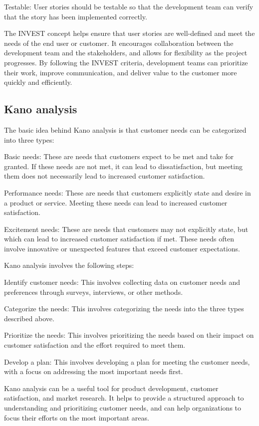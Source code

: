 \documentclass[12pt, a4paper, oneside]{article}
\begin{document}
Testable: User stories should be testable so that the development team can verify that the story has been implemented correctly.

The INVEST concept helps ensure that user stories are well-defined and meet the needs of the end user or customer. It encourages collaboration between the development team and the stakeholders, and allows for flexibility as the project progresses. By following the INVEST criteria, development teams can prioritize their work, improve communication, and deliver value to the customer more quickly and efficiently.




\subsection{ Kano analysis }
The basic idea behind Kano analysis is that customer needs can be categorized into three types:

Basic needs: These are needs that customers expect to be met and take for granted. If these needs are not met, it can lead to dissatisfaction, but meeting them does not necessarily lead to increased customer satisfaction.

Performance needs: These are needs that customers explicitly state and desire in a product or service. Meeting these needs can lead to increased customer satisfaction.

Excitement needs: These are needs that customers may not explicitly state, but which can lead to increased customer satisfaction if met. These needs often involve innovative or unexpected features that exceed customer expectations.

Kano analysis involves the following steps:

Identify customer needs: This involves collecting data on customer needs and preferences through surveys, interviews, or other methods.

Categorize the needs: This involves categorizing the needs into the three types described above.

Prioritize the needs: This involves prioritizing the needs based on their impact on customer satisfaction and the effort required to meet them.

Develop a plan: This involves developing a plan for meeting the customer needs, with a focus on addressing the most important needs first.

Kano analysis can be a useful tool for product development, customer satisfaction, and market research. It helps to provide a structured approach to understanding and prioritizing customer needs, and can help organizations to focus their efforts on the most important areas.
\end{document}
